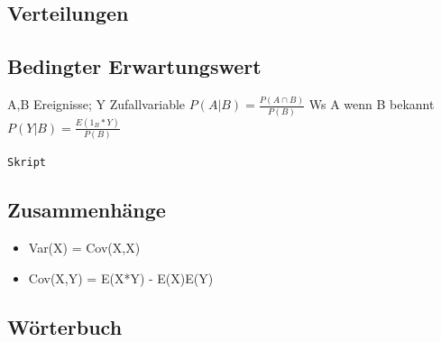 \documentclass[11pt]{article}
\begin{document}
\subsection{Verteilungen}
\label{sec-3-2}
\subsection{Bedingter Erwartungswert}
\label{sec-3-3}

A,B Ereignisse; Y Zufallvariable
$P(A|B) = \frac{P(A \cap B)}{P(B)}$ Ws A wenn B bekannt
$P(Y|B) = \frac{E(1_{B} * Y)}{P(B)}$

\texttt{Skript}
\subsection{Zusammenhänge}
\label{sec-3-4}

\begin{itemize}
\item Var(X) = Cov(X,X)
\item Cov(X,Y) = E(X*Y) - E(X)E(Y)
\end{itemize}
\subsection{Wörterbuch}
\label{sec-3-5}
\end{document}
